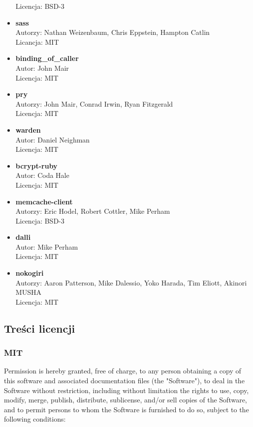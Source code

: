 \documentclass[11pt,a4paper, twoside]{article}
\begin{document}
\begin{itemize}
Licencja: BSD-3
\item \textbf{sass} \\
Autorzy: Nathan Weizenbaum, Chris Eppstein, Hampton Catlin \\
Licancja: MIT
\item \textbf{binding\_of\_caller} \\ 
Autor: John Mair \\
Licencja: MIT
\item \textbf{pry} \\
Autorzy: John Mair, Conrad Irwin, Ryan Fitzgerald \\
Licencja: MIT
\item \textbf{warden} \\ 
Autor: Daniel Neighman \\
Licencja: MIT
\item \textbf{bcrypt-ruby} \\ 
Autor: Coda Hale \\
Licencja: MIT
\item \textbf{memcache-client} \\
Autorzy: Eric Hodel, Robert Cottler, Mike Perham \\
Licencja:  BSD-3
\item \textbf{dalli} \\ 
Autor: Mike Perham \\
Licencja: MIT
\item \textbf{nokogiri} \\ 
Autorzy: Aaron Patterson, Mike Dalessio, Yoko Harada, Tim Eliott, Akinori MUSHA  \\
Licencja: MIT
\end{itemize}
\newpage

\subsection{Treści licencji}
\subsubsection{MIT}
Permission is hereby granted, free of charge, to any person obtaining
a copy of this software and associated documentation files (the
"Software"), to deal in the Software without restriction, including
without limitation the rights to use, copy, modify, merge, publish,
distribute, sublicense, and/or sell copies of the Software, and to
permit persons to whom the Software is furnished to do so, subject to
the following conditions:
\end{document}
